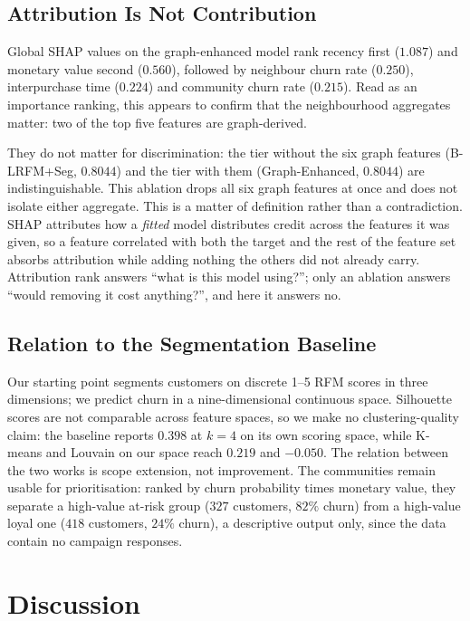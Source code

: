 \documentclass[runningheads]{llncs}
\begin{document}
\subsection{Attribution Is Not Contribution}

Global SHAP values \cite{lundberg2017shap} on the graph-enhanced model rank
recency first ($1.087$) and monetary value second ($0.560$), followed by
neighbour churn rate ($0.250$), interpurchase time ($0.224$) and community churn
rate ($0.215$). Read as an importance ranking, this appears to confirm that the
neighbourhood aggregates matter: two of the top five features are graph-derived.

They do not matter for discrimination: the tier without the six graph features
(B-LRFM+Seg, $0.8044$) and the tier with them (Graph-Enhanced, $0.8044$) are
indistinguishable. This ablation drops all six graph features at once and does
not isolate either aggregate. This is a matter of definition rather than a
contradiction.
SHAP attributes how a \emph{fitted} model distributes credit across the features
it was given, so a feature correlated with both the target and the rest of the
feature set absorbs attribution while adding nothing the others did not already
carry. Attribution rank answers ``what is this model using?''; only an ablation
answers ``would removing it cost anything?'', and here it answers no.

\subsection{Relation to the Segmentation Baseline}

Our starting point \cite{viannafilho2026rfm} segments customers on discrete 1--5
RFM scores in three dimensions; we predict churn in a nine-dimensional continuous
space. Silhouette scores are not comparable across feature spaces, so we make no
clustering-quality claim: the baseline reports $0.398$ at $k = 4$ on its own
scoring space, while K-means and Louvain on our space reach $0.219$ and
$-0.050$. The relation between the two works is scope extension, not
improvement. The communities remain usable for prioritisation: ranked by churn
probability times monetary value, they separate a high-value at-risk group
($327$ customers, $82\%$ churn) from a high-value loyal one ($418$ customers,
$24\%$ churn), a descriptive output only, since the data contain no campaign
responses.

\section{Discussion}
\label{sec:disc}
\end{document}
